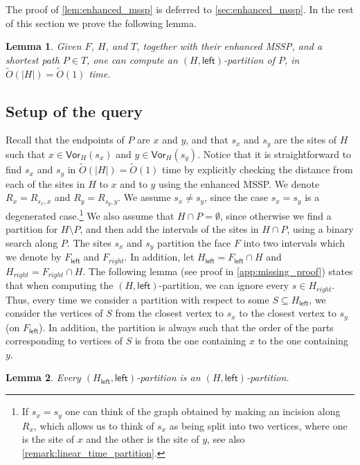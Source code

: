 \documentclass{article}
\newcommand{\leftside}{\mathsf{left}}
\newcommand{\Vor}{\textsf{Vor}}
\newtheorem{lemma}{Lemma}
\newcommand{\Otild}{\tilde{O}}
\begin{document}
The proof of  \cref{lem:enhanced_mssp} is deferred to \cref{sec:enhanced_mssp}.
In the rest of this section we prove the following lemma.

\begin{lemma}\label{lem:out_partition}
Given  $F$, $H$, and $T$, together with their enhanced MSSP, and a shortest path  $P \in T$, one can compute an $(H,\leftside)$-partition of $P$, in $\Otild(|H|)=\Otild(1)$ time.
\end{lemma}

\subsection{Setup of the query}

Recall that the endpoints of $P$ are $x$ and $y$, and that $s_x$ and $s_y$ are the sites of $H$ such that $x\in \Vor_H(s_x)$  and $y\in\Vor_H(s_y)$.
Notice that it is straightforward to find $s_x$ and $s_y$ in $\Otild(|H|)=\Otild(1)$ time by explicitly checking the distance from each of the sites in $H$ to $x$  and to $y$ using the enhanced MSSP.
We denote $R_x=R_{s_x,x}$ and $R_y=R_{s_y,y}$.
We assume $s_x\ne s_y$, since the case $s_x=s_y$ is a degenerated case.\footnote{
If $s_x=s_y$ one can think of the graph obtained by making an incision along $R_x$, which allows us to think of $s_x$ as being split into two vertices, where one is the site of $x$ and the other is the site of $y$, see also \cref{remark:linear_time_partition}.}
We also assume that $H\cap P=\emptyset$, since otherwise we find a partition for $H\setminus P$, and then add the intervals of the sites in $H\cap P$, using a binary search along $P$.
The sites $s_x$ and $s_y$ partition the face $F$ into two intervals which we denote by $F_{\leftside}$ and $F_{right}$.
In addition, let $H_{\leftside}=F_{\leftside}\cap H$ and $H_{right}=F_{right}\cap H$.
The following lemma (see proof in \cref{app:missing_proof}) states that when computing the
$(H,\leftside)$-partition, we can ignore every $s\in H_{right}$.
Thus, every time we consider a partition with respect to some $S\subseteq H_{\leftside}$, we consider the vertices of $S$ from the closest vertex to $s_x$ to the closest vertex to $s_y$ (on $F_{\leftside}$).
In addition, the partition is always such that the order of the parts corresponding to vertices of $S$ is from the one containing $x$ to the one containing $y$.


\begin{lemma}\label{lem:Hleft-is-enough}
Every $(H_{\leftside},\leftside)$-partition is an $(H,\leftside)$-partition.
\end{lemma}
\end{document}
